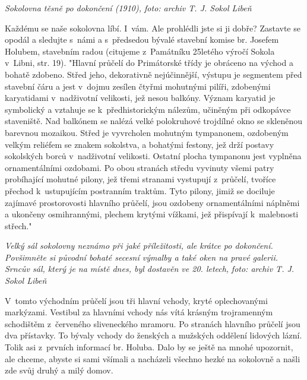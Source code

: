 \documentclass[a5paper, 12pt, twoside]{article}
\begin{document}

\textit{Sokolovna těsně po dokončení (1910), foto: archiv T. J. Sokol
Libeň}

Každému se naše sokolovna líbí. I~vám. Ale prohlédli jste si ji dobře?
Zastavte se opodál a sledujte s~námi a s~předsedou bývalé stavební
komise br. Josefem Holubem, stavebním radou (citujeme z~Památníku
25letého výročí Sokola v~Libni, str. 19). "Hlavní průčelí do Primátorské
třídy je obráceno na východ a bohatě zdobeno. Střed jeho, dekorativně
nejúčinnější, výstupu je segmentem před stavební čáru a jest v~dojmu
zesílen čtyřmi mohutnými pilíři, zdobenými karyatidami v~nadživotní
velikosti, jež nesou balkóny. Význam karyatid je symbolický a vztahuje
se k~předhistorickým nálezům, učiněným při odkopávce staveniště. Nad
balkónem se nalézá velké polokruhové trojdílné okno se skleněnou
barevnou mozaikou. Střed je vyvrcholen mohutným tympanonem, ozdobeným
velkým reliéfem se znakem sokolstva, a bohatými festony, jež drží
postavy sokolských borců v~nadživotní velikosti. Ostatní plocha
tympanonu jest vyplněna ornamentálními ozdobami. Po obou stranách středu
vyvinuty všemi patry probíhající mohutné pilony, jež třemi stranami
vystupují z~průčelí, tvoříce přechod k~ustupujícím postranním traktům.
Tyto pilony, jimiž se dociluje zajímavé prostorovosti hlavního průčelí,
jsou ozdobeny ornamentálními náplněmi a ukončeny osmihrannými, plechem
krytými vížkami, jež přispívají k~malebnosti střech."


\textit{Velký sál sokolovny neznámo při jaké příležitosti, ale krátce po
dokončení. Povšimněte si původní bohaté secesní výmalby a také oken na
pravé galerii. Srncův sál, který je na místě dnes, byl dostavěn ve 20.
letech,} \textit{foto: archiv T. J. Sokol Libeň}

V~tomto východním průčelí jsou tři hlavní vchody, kryté oplechovanými
markýzami. Vestibul za hlavními vchody nás vítá krásným trojramenným
schodištěm z~červeného sliveneckého mramoru. Po stranách hlavního
průčelí jsou dva přístavky. To bývaly vchody do ženských a mužských
oddělení lidových lázní. Tolik asi z~prvních informací br. Holuba. Dalo
by se ještě na mnohé upozornit, ale chceme, abyste si sami všímali a
nacházeli všechno hezké na sokolovně a našli zde svůj druhý a milý
domov.
\end{document}
